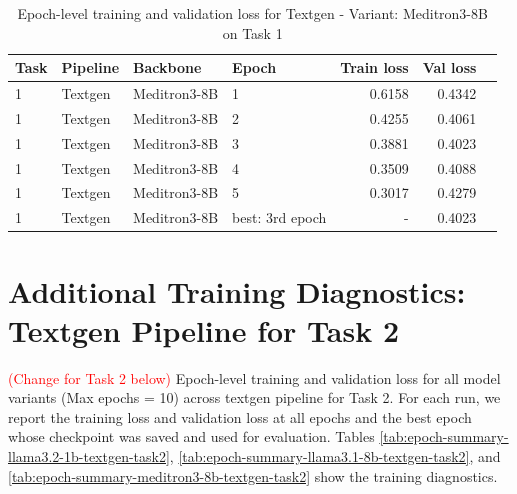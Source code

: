 \begin{table}[t]
    \centering
    \caption{Epoch-level training and validation loss for Textgen - Variant: Meditron3-8B on Task 1}
    \label{tab:epoch-summary-meditron3-8b-textgen-task1}
    \begin{tabular}{llllrrr}
        \toprule
        Task & Pipeline & Backbone & Epoch & Train loss & Val loss \\
        \midrule
        1 & Textgen & Meditron3-8B   & 1   & 0.6158 & 0.4342 \\
        1 & Textgen & Meditron3-8B   & 2 & 0.4255 & 0.4061 \\
        1 & Textgen & Meditron3-8B   & 3 & 0.3881 & 0.4023 \\
        1 & Textgen & Meditron3-8B   & 4 & 0.3509 & 0.4088 \\
        1 & Textgen & Meditron3-8B   & 5 & 0.3017 & 0.4279 \\
        \midrule
        1 & Textgen & Meditron3-8B   & best: 3rd epoch & - & 0.4023 \\
        \bottomrule
    \end{tabular}
\end{table}


\section{Additional Training Diagnostics: Textgen Pipeline for Task 2}
\textcolor{red}{(Change for Task 2 below)}
\label{app:training-diagnostics-textgen-task2}
Epoch-level training and validation loss for all model variants (Max epochs = 10) across textgen pipeline for Task 2. For each run, we report the training loss and validation loss at all epochs and the best epoch whose checkpoint was saved and used for evaluation.
Tables \ref{tab:epoch-summary-llama3.2-1b-textgen-task2}, \ref{tab:epoch-summary-llama3.1-8b-textgen-task2}, and \ref{tab:epoch-summary-meditron3-8b-textgen-task2} show the training diagnostics.

